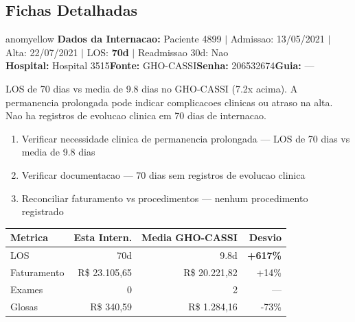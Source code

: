 \documentclass[a4paper,10pt]{article}
\begin{document}
\subsection{Fichas Detalhadas}
\begin{anomalycard}[Internacao 4647 | GHO-CASSI | MODERADO (z=2.49)]{anomyellow}
\textbf{Dados da Internacao:} Paciente 4899 $\mid$ Admissao: 13/05/2021 $\mid$ Alta: 22/07/2021 $\mid$ LOS: \textbf{70d} $\mid$ Readmissao 30d: Nao\\
\textbf{Hospital:} Hospital 3515\quad\textbf{Fonte:} GHO-CASSI\quad\textbf{Senha:} 206532674\quad\textbf{Guia:} ---\\
\vspace{2pt}\begin{tcolorbox}[colback=severityred!20,colframe=anomyellow,title={\textbf{Interpretacao de Negocio}},fonttitle=\bfseries\small,left=4pt,right=4pt,top=3pt,bottom=3pt]
{\small LOS de 70 dias vs media de 9.8 dias no GHO-CASSI (7.2x acima). A permanencia prolongada pode indicar complicacoes clinicas ou atraso na alta. Nao ha registros de evolucao clinica em 70 dias de internacao.}
\end{tcolorbox}
\begin{tcolorbox}[colback=severityyellow!30,colframe=anomorange,title={\textbf{Recomendacoes Especificas}},fonttitle=\bfseries\small,left=4pt,right=4pt,top=3pt,bottom=3pt]
\begin{enumerate}[nosep,leftmargin=16pt]
\item {\small Verificar necessidade clinica de permanencia prolongada --- LOS de 70 dias vs media de 9.8 dias}
\item {\small Verificar documentacao --- 70 dias sem registros de evolucao clinica}
\item {\small Reconciliar faturamento vs procedimentos --- nenhum procedimento registrado}
\end{enumerate}
\end{tcolorbox}
\begin{center}\begin{tabular}{l r r r}\toprule\textbf{Metrica} & \textbf{Esta Intern.} & \textbf{Media GHO-CASSI} & \textbf{Desvio} \\\midrule
LOS & 70d & 9.8d & \textcolor{anomred}{\textbf{+617\%}} \\
Faturamento & R\$ 23.105,65 & R\$ 20.221,82 & +14\% \\
Exames & 0 & 2 & --- \\
Glosas & R\$ 340,59 & R\$ 1.284,16 & -73\% \\
\bottomrule\end{tabular}\end{center}


\end{anomalycard}
\end{document}
